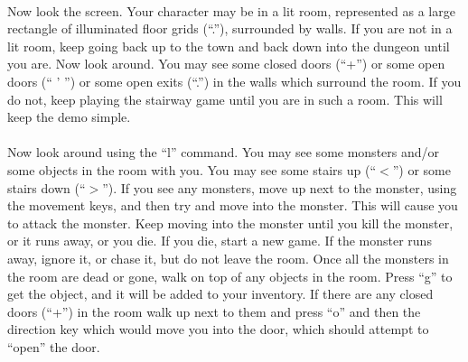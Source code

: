 \paragraph{}Now look the screen. Your character may be in a lit room, represented
as a large rectangle of illuminated floor grids (``.''), surrounded by
walls. If you are not in a lit room, keep going back up to the town and
back down into the dungeon until you are. Now look around. You may see
some closed doors (``+'') or some open doors (`` ' '') or some open exits
(``.'') in the walls which surround the room. If you do not, keep playing
the stairway game until you are in such a room. This will keep the demo
simple.

\paragraph{}Now look around using the ``l'' command. You may see some monsters and/or
some objects in the room with you. You may see some stairs up (``$<$'') or
some stairs down (``$>$''). If you see any monsters, move up next to the
monster, using the movement keys, and then try and move into the
monster. This will cause you to attack the monster. Keep moving into
the monster until you kill the monster, or it runs away, or you die. If
you die, start a new game. If the monster runs away, ignore it, or
chase it, but do not leave the room. Once all the monsters in the room
are dead or gone, walk on top of any objects in the room. Press ``g'' to
get the object, and it will be added to your inventory. If there are
any closed doors (``+'') in the room walk up next to them and press
``o'' and then the direction key which would move you into the door, which
should attempt to ``open'' the door.

